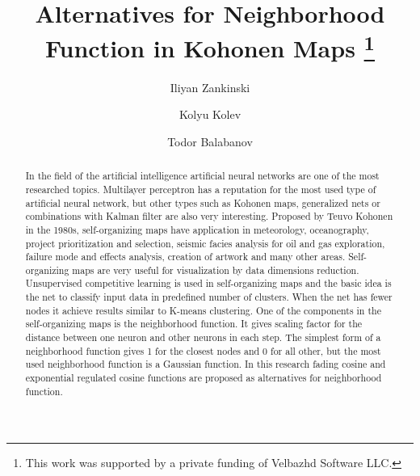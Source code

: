 \documentclass[runningheads]{llncs}
\begin{document}
\title{Alternatives for Neighborhood Function in Kohonen Maps \thanks{This work was supported by a private funding of Velbazhd Software LLC.}}

\author{Iliyan Zankinski \and
Kolyu Kolev \and
Todor Balabanov}


\maketitle

\begin{abstract}
In the field of the artificial intelligence artificial neural networks are one of the most researched topics. Multilayer perceptron has a reputation for the most used type of artificial neural network, but other types such as Kohonen maps, generalized nets\cite{tashev01} or combinations with Kalman filter\cite{alexandrov01} are also very interesting. Proposed by Teuvo Kohonen in the 1980s, self-organizing maps have application in meteorology, oceanography, project prioritization and selection, seismic facies analysis for oil and gas exploration, failure mode and effects analysis, creation of artwork and many other areas. Self-organizing maps are very useful for visualization by data dimensions reduction. Unsupervised competitive learning is used in self-organizing maps and the basic idea is the net to classify input data in predefined number of clusters. When the net has fewer nodes it achieve results similar to K-means clustering. One of the components in the self-organizing maps is the neighborhood function. It gives scaling factor for the distance between one neuron and other neurons in each step. The simplest form of a neighborhood function gives 1 for the closest nodes and 0 for all other, but the most used neighborhood function is a Gaussian function. In this research fading cosine and exponential regulated cosine functions are proposed as alternatives for neighborhood function.

\end{abstract}
\end{document}
